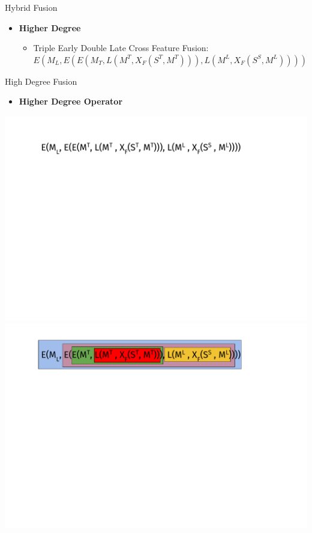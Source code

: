\documentclass[10pt,=table]{beamer}
\begin{document}
\begin{frame}{Hybrid Fusion}
\begin{itemize}
\begin{overprint}
		\begin{itemize}
		\item \textbf{Higher Degree}
			\begin{itemize}
			\item Triple Early Double Late Cross Feature Fusion: $E(M_L , E(E(M_T , L(M^T , X_F (S^T , M^T ))) , L(M^L , X_F (S^S , M^L))))$
			\end{itemize}
		\end{itemize}
		
\end{overprint}
	

\end{itemize}
\vfill
\end{frame}

\begin{frame}{High Degree Fusion}
\begin{itemize}
\item[] \large \textbf{Higher Degree Operator }
\end{itemize}
\begin{overprint}
	\includegraphics[width=1\linewidth]{image2/Chapitre2/hybrid_fusion0.pdf}%
	\onslide<2>\includegraphics[width=1\linewidth]{image2/Chapitre2/hybrid_fusiona.pdf}%

\end{overprint}
\end{frame}
\end{document}
